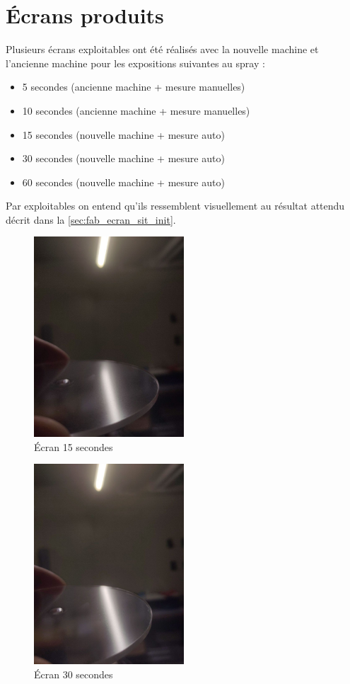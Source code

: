 \section{Écrans produits}
Plusieurs écrans exploitables ont été réalisés avec la nouvelle machine et l'ancienne machine pour les expositions suivantes au spray :
\begin{itemize}
    \item 5 secondes (ancienne machine + mesure manuelles)
    \item 10 secondes (ancienne machine + mesure manuelles)
    \item 15 secondes (nouvelle machine + mesure auto)
    \item 30 secondes (nouvelle machine + mesure auto)
    \item 60 secondes (nouvelle machine + mesure auto)
\end{itemize}
Par exploitables on entend qu'ils ressemblent visuellement au résultat attendu décrit dans la \autoref{sec:fab_ecran_sit_init}.
\begin{figure}[H]
    \centering
    \includegraphics[width = 0.5\textwidth]{assets/figures/mesures/15_sec.jpeg}
    \caption{Écran 15 secondes}
\end{figure}

\begin{figure}[H]
    \centering
    \includegraphics[width = 0.5\textwidth]{assets/figures/mesures/30_sec.jpeg}
    \caption{Écran 30 secondes}
\end{figure}

